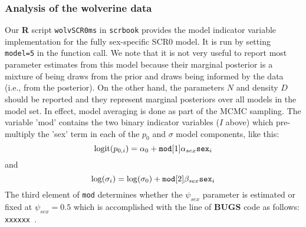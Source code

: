 \subsubsection{Analysis of the wolverine data}

Our {\bf R} script \mbox{\tt wolvSCR0ms} in \mbox{\tt scrbook} 
provides the model indicator variable implementation for the fully
sex-specific SCR0 model.  It is run by setting \mbox{\tt model=5} in
the function call. We
note that it is not very useful to report most parameter estimates
from this model because their marginal posterior is a mixture of being
draws from the prior and draws  being informed by the data (i.e., from
the posterior). On the other hand, the
parameters $N$ and density $D$ should be reported and they represent
marginal posteriors over all models in the model set. In effect, model
averaging is done as part of the MCMC sampling.
 The variable 'mod'
contains the two binary indicator variables ($I$ above) which pre-multiply the 'sex'
term in each of the $p_{0}$ and $\sigma$ model components, like this:
\[
 \mbox{logit}(p_{0,i}) = \alpha_{0} + \mbox{\tt mod}[1] \alpha_{sex} \mbox{\tt sex}_{i}
\]
and
\[
 \mbox{log}(\sigma_{i}) = \log(\sigma_{0}) + \mbox{\tt mod}[2] \beta_{sex} \mbox{\tt sex}_{i}
\]
The third element of \mbox{\tt mod} determines whether the
$\psi_{sex}$ parameter is estimated or fixed at $\psi_{sex} =
0.5$ which is accomplished with the line of {\bf BUGS} code as follows:
\mbox{\tt xxxxxx }.


